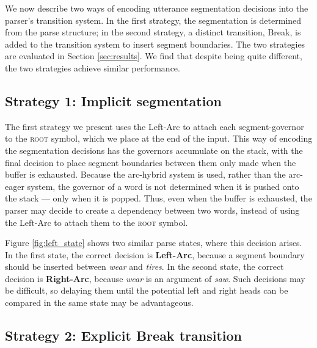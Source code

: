 \documentclass[11pt,letterpaper]{article}
\begin{document}
We now describe two ways of encoding utterance segmentation decisions into the
parser's transition system.  In the first strategy, the segmentation is determined
from the parse structure; in the second strategy, a distinct transition, Break,
is added to the transition system to insert segment boundaries.
The two strategies are evaluated in Section \ref{sec:results}.
We find that despite being quite different, the two strategies achieve similar
performance.

\subsection{Strategy 1: Implicit segmentation}

The first strategy we present uses the Left-Arc to attach each segment-governor
to the \textsc{root} symbol, which we place at the end of the input.
This way of encoding the segmentation decisions has the governors accumulate on
the stack, with the final decision to place segment boundaries between them only
made when the buffer is exhausted.  Because the arc-hybrid system is used, rather
than the arc-eager system, the governor of a word is not determined when it is pushed
onto the stack --- only when it is popped.  Thus, even when the buffer is exhausted,
the parser may decide to create a dependency between two words, instead of
using the Left-Arc to attach them to the \textsc{root} symbol.

Figure \ref{fig:left_state} shows two similar parse states, where this decision
arises.  In the first state, the correct decision is \textbf{Left-Arc}, because
a segment boundary should be inserted between \emph{wear} and \emph{tires}.
In the second state, the correct decision is \textbf{Right-Arc}, because
\emph{wear} is an argument of \emph{saw}.  Such decisions may be difficult,
so delaying them until the potential left and right heads can be compared in the
same state may be advantageous.

\subsection{Strategy 2: Explicit Break transition}
\end{document}
